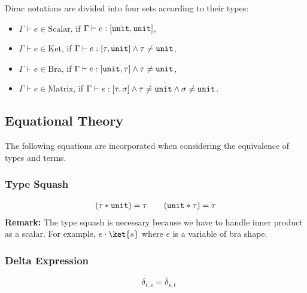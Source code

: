 \begin{definition}
    Dirac notations are divided into four sets according to their types:
    \begin{itemize}
        \item $\Gamma \vdash e \in \textrm{Scalar}$, if $\Gamma \vdash e : [\texttt{unit}, \texttt{unit}]$,
        \item $\Gamma \vdash e \in \textrm{Ket}$, if $\Gamma \vdash e : [\tau, \texttt{unit}]\wedge\tau \neq \texttt{unit}$,
        \item $\Gamma \vdash e \in \textrm{Bra}$, if $\Gamma \vdash e : [\texttt{unit}, \tau]\wedge\tau \neq \texttt{unit}$,
        \item $\Gamma \vdash e \in \textrm{Matrix}$, if $\Gamma \vdash e : [\tau, \sigma]\wedge\tau \neq \texttt{unit}\wedge\sigma \neq \texttt{unit}$.
    \end{itemize}
\end{definition}



\subsection{Equational Theory}
The following equations are incorporated when considering the equivalence of types and terms.

\subsubsection*{Type Squash}
\begin{gather*}
  (\tau * \texttt{unit})  = \tau \qquad (\texttt{unit} * \tau) = \tau \\
\end{gather*}
\textbf{Remark:} The type squash is necessary because we have to handle inner product as a scalar. For example, $e \cdot \ket{s}$ where $e$ is a variable of bra shape.

\subsubsection*{Delta Expression}
\begin{align*}
    & \delta_{t, s} = \delta_{s, t}
\end{align*}

